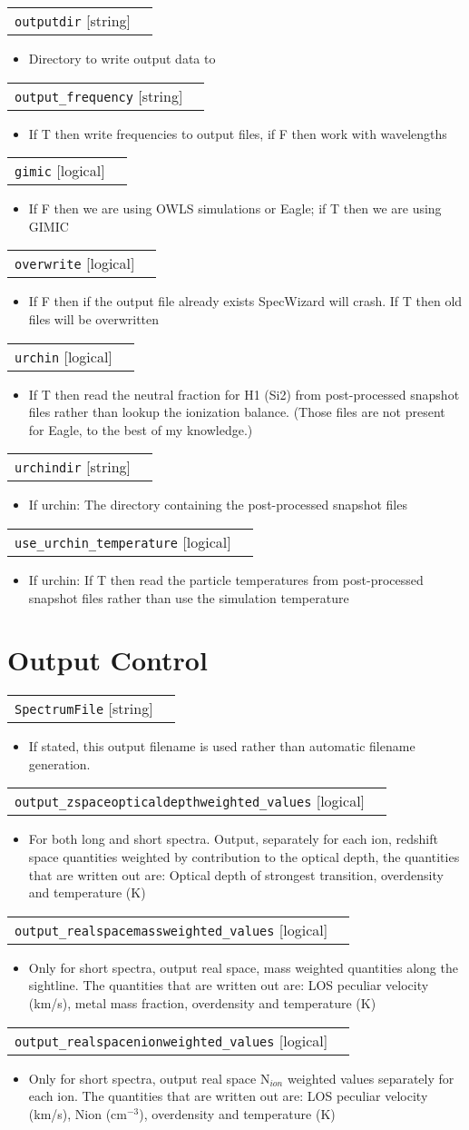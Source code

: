 \documentclass{report}
\makeatletter
\newcommand{\paramdefinition}[3]{
\begin{tabular*}{\textwidth}{l@{\extracolsep{\fill}}r}
		{\tt #1} [{\sc #2}]& #3 \\
\end{tabular*}}
\newcommand{\paramdescription}[1]{
\begin{itemize}
\item #1
\end{itemize}\vspace{0.2cm}}
\makeatother
\begin{document}
\paramdefinition{outputdir}{string}{}
\paramdescription{Directory to write output data to}

\paramdefinition{output\_frequency}{string}{}
\paramdescription{If T then write frequencies to output files, if F then work with wavelengths}

\paramdefinition{gimic}{logical}{}
\paramdescription{If F then we are using OWLS simulations or Eagle; if T then we are using GIMIC}

\paramdefinition{overwrite}{logical}{}
\paramdescription{If F then if the output file already exists SpecWizard will crash.  If T then old files will be overwritten}

\paramdefinition{urchin}{logical}{}
\paramdescription{If T then read the neutral fraction for H1 (Si2) from post-processed snapshot files rather than lookup the ionization balance. (Those files are not present for Eagle, to the best of my knowledge.)}

\paramdefinition{urchindir}{string}{}
\paramdescription{If urchin: The directory containing the post-processed snapshot files}

\paramdefinition{use\_urchin\_temperature}{logical}{}
\paramdescription{If urchin: If T then read the particle temperatures from post-processed snapshot files rather than use the simulation temperature}

\section{Output Control}

\paramdefinition{SpectrumFile}{string}{}
\paramdescription{If stated, this output filename is used rather than automatic filename generation.}

\paramdefinition{output\_zspaceopticaldepthweighted\_values}{logical}{ }
\paramdescription{For both long and short spectra. Output, separately for each ion, redshift space quantities weighted by contribution to the optical depth, the quantities that are written out are:  Optical depth of strongest transition, overdensity and temperature (K)}

\paramdefinition{output\_realspacemassweighted\_values}{logical}{ }
\paramdescription{Only for short spectra, output real space, mass weighted quantities along the sightline.  The quantities that are written out are: LOS peculiar velocity (km/s), metal mass fraction, overdensity and temperature (K)}

\paramdefinition{output\_realspacenionweighted\_values}{logical}{ }
\paramdescription{Only for short spectra, output real space N$_{ion}$ weighted values separately for each ion.  The quantities that are written out are: LOS peculiar velocity (km/s), Nion (cm$^{-3}$), overdensity and temperature (K)}
\end{document}
